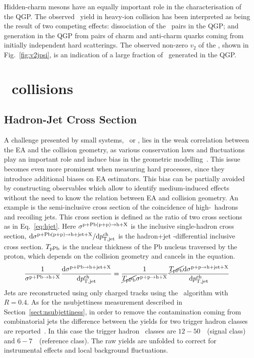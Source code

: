 \documentclass[10pt]{article}
\begin{document}
Hidden-charm mesons have an equally important role in the characterisation of the QGP.
The observed \jpsi\ yield in heavy-ion collision has been interpreted as being the result of two competing effects: dissociation of the \ccbar\ pairs in the QGP; and generation in the QGP from pairs of charm and anti-charm quarks coming from initially independent hard scatterings.
The observed non-zero $v_2$ of the \jpsi, shown in Fig.~\ref{fig:v2jpsi}, is an indication of a large fraction of \jpsi\ generated in the QGP.

\section{\pPb\ collisions}

\subsection{Hadron-Jet Cross Section} 
A challenge presented by small systems, \pp\ or \pPb, lies in the weak correlation between the EA and the collision geometry,
as various conservation laws and fluctuations play an important role and induce bias in the geometric modelling~\cite{ALICE:2014e}. 
This issue becomes even more prominent when measuring hard processes, since they introduce additional biases on EA estimators.
This bias can be partially avoided by constructing observables which allow to identify medium-induced effects without the need to know the relation between EA and collision geometry. 
An example is the semi-inclusive cross section of the coincidence of high-\pt\ hadrons and recoiling jets.
This cross section is defined as the ratio of two cross sections as in Eq.~\ref{eq:hjet}. Here $\sigma^{{\rm p+Pb (p+p)}\rightarrow{\rm h+X}}$ is the inclusive single-hadron cross
section, $\mathrm{d}\sigma^{{\rm p+Pb (p+p)}\rightarrow{\rm h+jet+X}}/ \mathrm{d}p_{\rm T,jet}^{\rm ch}$ is the hadron+jet \pt-differential inclusive cross section.
$T_{\rm pPb}$ is the nuclear thickness of the Pb nucleus traversed by the proton, which depends on the collision geometry and cancels in the equation.
\begin{equation}
\frac{1}{\sigma^{{\rm p+Pb}\rightarrow{\rm h+X}}} \frac{\mathrm{d}\sigma^{{\rm p+Pb}\rightarrow{\rm h+jet+X}}}{\mathrm{d}p_{\rm T,jet}^{\rm ch}} = 
\frac{1}{\cancel{T_{\rm pPb}}\sigma^{{\rm p+p}\rightarrow{\rm h+X}}} \frac{\cancel{T_{\rm pPb}}\mathrm{d}\sigma^{{\rm p+p}\rightarrow{\rm h+jet+X}}}{\mathrm{d}p_{\rm T,jet}^{\rm ch}}
\label{eq:hjet}
\end{equation}
Jets are reconstructed using only charged tracks using the \antikt\ algorithm with $R=0.4$.
As for the nsubjettiness measurement described in Section~\ref{sect:nsubjettiness}, in order to remove the contamination coming from combinatorial jets the difference between the yields
for two trigger hadron classes are reported~\cite{ALICE:2015g}. In this case the trigger hadron \pt\ classes are $12-50$~\GeVc\ (signal class) and $6-7$~\GeVc\ (reference class).
The raw yields are unfolded to correct for instrumental effects and local background fluctuations.
\end{document}
